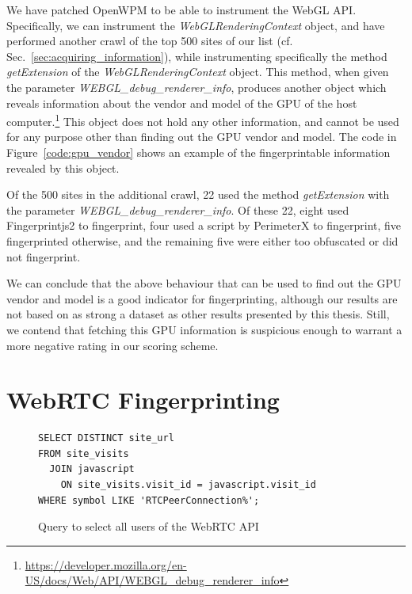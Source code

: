 \documentclass[
    fontsize=12pt,
    headings=small,
    parskip=half,
    bibliography=totoc,
    numbers=noenddot,
    open=any
    ]{scrreprt}
\begin{document}
We have patched OpenWPM to be able to instrument the WebGL API.
Specifically, we can instrument the \textit{WebGLRenderingContext}
object, and have performed another crawl of the top 500 sites of our list (cf. Sec.~\ref{sec:acquiring_information}),
while instrumenting specifically the method \textit{getExtension} of the \textit{WebGLRenderingContext} object.
This method, when given the parameter \textit{WEBGL\_debug\_renderer\_info}, produces another object
which reveals information about the vendor and model of the GPU of the host computer.\footnote{\url{https://developer.mozilla.org/en-US/docs/Web/API/WEBGL_debug_renderer_info}}
This object does not hold any other information, and cannot be used for any purpose other than
finding out the GPU vendor and model.
The code in Figure~\ref{code:gpu_vendor} shows an example of the fingerprintable information
revealed by this object.

Of the 500 sites in the additional crawl, 22 used the method \textit{getExtension} with the parameter
\textit{WEBGL\_debug\_renderer\_info}. Of these 22, eight used Fingerprintjs2 to fingerprint, four
used a script by PerimeterX to fingerprint, five fingerprinted otherwise, and the remaining five
were either too obfuscated or did not fingerprint.

We can conclude that the above behaviour that can be used to find out the GPU vendor and model
is a good indicator for fingerprinting, although our results are not based on as strong a dataset
as other results presented by this thesis. Still, we contend that fetching this GPU information
is suspicious enough to warrant a more negative rating in our scoring scheme.


\section{WebRTC Fingerprinting}
\begin{figure}
\begin{verbatim}
SELECT DISTINCT site_url
FROM site_visits
  JOIN javascript
    ON site_visits.visit_id = javascript.visit_id
WHERE symbol LIKE 'RTCPeerConnection%';
\end{verbatim}
\caption{Query to select all users of the WebRTC API}
\label{code:webrtc_query}
\end{figure}
\end{document}

